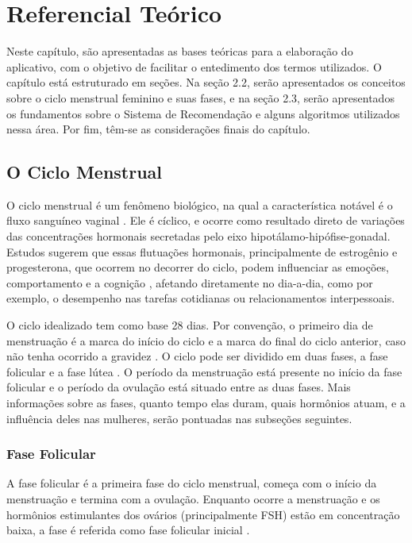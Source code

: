 \chapter[Referencial Teórico]{Referencial Teórico}
\label{ch:referencial}

Neste capítulo, são apresentadas as bases teóricas para a elaboração do 
aplicativo, com o objetivo de facilitar o entedimento dos termos utilizados. 
O capítulo está estruturado em seções. Na seção 2.2, serão apresentados os 
conceitos sobre o ciclo menstrual feminino e suas fases, e na seção 2.3, serão 
apresentados os fundamentos sobre o Sistema de Recomendação e alguns algoritmos 
utilizados nessa área. Por fim, têm-se as considerações finais do capítulo.

\section{O Ciclo Menstrual}

O ciclo menstrual é um fenômeno biológico, 
na qual a característica notável é o fluxo sanguíneo vaginal \cite{guyton2012}.
Ele é cíclico, e ocorre como resultado direto de variações das concentrações
hormonais secretadas pelo eixo hipotálamo-hipófise-gonadal. Estudos sugerem
que essas flutuações hormonais, principalmente de estrogênio e progesterona,
que ocorrem no decorrer do ciclo, podem influenciar as emoções,
comportamento e a cognição \cite{poroma2014}, afetando
diretamente no dia-a-dia, como por exemplo, o desempenho nas tarefas
cotidianas ou relacionamentos interpessoais.


O ciclo idealizado tem como base 28 dias. Por convenção, o primeiro dia de
menstruação é a marca do início do ciclo e a marca do final do ciclo
anterior, caso não tenha ocorrido a gravidez \cite{lenton1984a}. O ciclo
pode ser dividido em duas fases, a fase folicular e a fase lútea
\cite{brondin2008}. O período da menstruação está presente no início da
fase folicular e o período da ovulação está situado entre as duas fases.
Mais informações sobre as fases, quanto tempo elas duram, quais hormônios
atuam, e a influência deles nas mulheres, serão pontuadas nas subseções
seguintes.


\subsection{Fase Folicular}

A fase folicular é a primeira fase do ciclo menstrual, começa com o início
da menstruação e termina com a ovulação. Enquanto ocorre a menstruação e os
hormônios estimulantes dos ovários (principalmente FSH) estão em concentração
baixa, a fase é referida como fase folicular inicial \cite{lenton1984a}.

